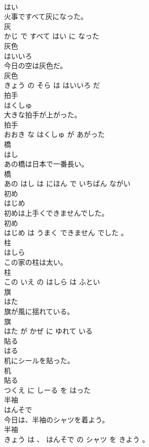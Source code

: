 \documentclass[8pt]{extreport}
\begin{document}
\begin{CJK}{UTF8}{min}
\\	はい			
\\	火事ですべて灰になった。	
\\	灰 
\\	かじ で すべて はい に なった			
\\	灰色	
\\	はいいろ			
\\	今日の空は灰色だ。	
\\	灰色 
\\	きょう の そら は はいいろ だ			
\\	拍手	
\\	はくしゅ			
\\	大きな拍手が上がった。	
\\	拍手 
\\	おおき な はくしゅ が あがった			
\\	橋	
\\	はし			
\\	あの橋は日本で一番長い。	
\\	橋 
\\	あの はし は にほん で いちばん ながい			
\\	初め	
\\	はじめ			
\\	初めは上手くできませんでした。	
\\	初め 
\\	はじめ は うまく できません でした 。			
\\	柱	
\\	はしら			
\\	この家の柱は太い。	
\\	柱 
\\	この いえ の はしら は ふとい			
\\	旗	
\\	はた			
\\	旗が風に揺れている。	
\\	旗 
\\	はた が かぜ に ゆれて いる			
\\	貼る	
\\	はる			
\\	机にシールを貼った。	
\\	机 
\\	貼る 
\\	つくえ に しーる を はった			
\\	半袖	
\\	はんそで			
\\	今日は、半袖のシャツを着よう。	
\\	半袖 
\\	きょう は 、 はんそで の シャツ を きよう 。			

\end{CJK}
\end{document}
